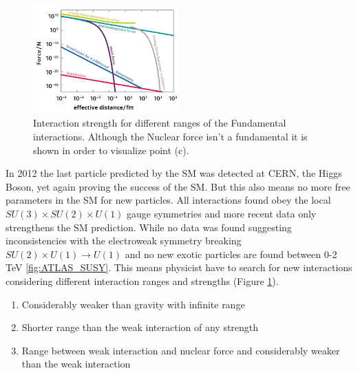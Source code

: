 \documentclass[../Bachelorarbeit.tex]{subfiles}
\begin{document}
\label{sec:BSM}
\begin{figure}
    \centering
    \includegraphics[width=0.5\textwidth]{images/Teilchenwet_WW_range.png}
    \caption{Interaction strength for different ranges of the Fundamental interactions. Although the Nuclear force isn't a fundamental it is shown in order to visualize point (c).  \cite{Teilchenwelt} }
    \label{fig:WW_range}
\end{figure}

In 2012 the last particle predicted by the SM was detected at CERN, the Higgs Boson, yet again proving the success of the SM.
But this also means no more free parameters in the SM for new particles. All interactions found obey the local $SU(3) \times SU(2) \times U(1)$ gauge symmetries
and more recent data only strengthens the SM prediction. While no data was found suggesting inconsistencies with the electroweak symmetry breaking $SU(2) \times U(1) \rightarrow U(1)$
and no new exotic particles are found between 0-2 TeV \ref{fig:ATLAS_SUSY}.
This means physicist have to search for new interactions considering different interaction ranges and strengths (Figure \ref{fig:WW_range}).
\begin{enumerate}[label=(\alph*)]
    \item Considerably weaker than gravity with infinite range
    \item Shorter range than the weak interaction of any strength
    \item Range between weak interaction and nuclear force and considerably weaker than the weak interaction
\end{enumerate}
\end{document}
